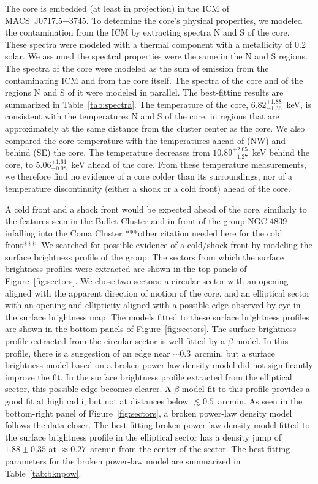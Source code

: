 The core is embedded (at least in projection) in the ICM of MACS~J0717.5+3745. To determine the core's physical properties, we  modeled the contamination from the ICM by extracting spectra N and S of the core. These spectra were modeled with a thermal component with a metallicity of 0.2 solar. We assumed the spectral properties were the same in the N and S regions. The spectra of the core were modeled as the sum of emission from the contaminating ICM and from the core itself. The spectra of the core and of the regions N and S of it were modeled in parallel. The best-fitting results are summarized in Table~\ref{tab:spectra}. The temperature of the core, $6.82_{-1.36}^{+1.88}$~keV, is consistent with the temperatures N and S of the core, in regions that are approximately at the same distance from the cluster center as the core. We also compared the core temperature with the temperatures ahead of (NW) and behind (SE) the core. The temperature decreases from $10.89_{-1.27}^{+2.05}$~keV behind the core, to $5.06_{-0.98}^{+1.61}$~keV ahead of the core. From these temperature measurements, we therefore find no evidence of a core colder than its surroundings, nor of a temperature discontinuity (either a shock or a cold front) ahead of the core. 

A cold front and a shock front would be expected ahead of the core, similarly to the features seen in the Bullet Cluster \citep{Markevitch2002} and in front of the group NGC 4839 infalling into the Coma Cluster \citep{Neumann2001} ***other citation needed here for the cold front***. We searched for possible evidence of a cold/shock front by modeling the surface brightness profile of the group. The sectors from which the surface brightness profiles were extracted are shown in the top panels of Figure~\ref{fig:sectors}. We chose two sectors: a circular sector with an opening aligned with the apparent direction of motion of the core, and an elliptical sector with an opening and ellipticity aligned with a possible edge observed by eye in the surface brightness map. The models fitted to these surface brightness profiles are shown in the bottom panels of Figure~\ref{fig:sectors}. The surface brightness profile extracted from the circular sector is well-fitted by a $\beta$-model. In this profile, there is a suggestion of an edge near $\sim 0.3$~arcmin, but a surface brightness model based on a broken power-law density model did not significantly improve the fit. In the surface brightness profile extracted from the elliptical sector, this possible edge becomes clearer. A $\beta$-model fit to this profile provides a good fit at high radii, but not at distances below $\lesssim 0.5$~arcmin. As seen in the bottom-right panel of Figure~\ref{fig:sectors}, a broken power-law density model follows the data closer. The best-fitting broken power-law density model fitted to the surface brightness profile in the elliptical sector has a density jump of $1.88\pm 0.35$ at $\approx 0.27$~arcmin from the center of the sector. The best-fitting parameters for the broken power-law model are summarized in Table~\ref{tab:bknpow}.

